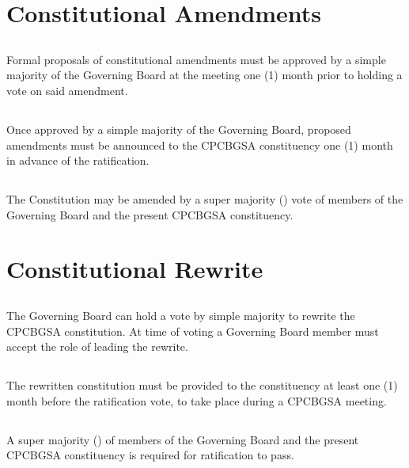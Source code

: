 \documentclass[11pt,a4paper]{article}
\begin{document}
 
\section{Constitutional Amendments}\label{article:9}
\subsection{}Formal proposals of constitutional amendments must be approved by a simple majority of the Governing Board at the meeting one (1) month prior to holding a vote on said amendment. 
\subsection{}Once approved by a simple majority of the Governing Board, proposed amendments must be announced to the CPCBGSA constituency one (1) month in advance of the ratification.
\subsection{}The Constitution may be amended by a super majority () vote of members of the Governing Board and the present CPCBGSA constituency.

\section{Constitutional Rewrite}\label{article:10}
\subsection{}The Governing Board can hold a vote by simple majority to rewrite the CPCBGSA constitution. At time of voting a Governing Board member must accept the role of leading the rewrite. 
\subsection{}The rewritten constitution must be provided to the constituency at least one (1) month before the ratification vote, to take place during a CPCBGSA meeting.
\subsection{}A super majority () of members of the Governing Board and the present CPCBGSA constituency is required for ratification to pass. 
\end{document}
